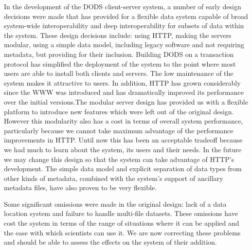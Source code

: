 \documentclass[12pt]{article}
\begin{document}
In the development of the \ac{DODS} client-server system, a number of early
design decisions were made that has provided for a flexible data system
capable of broad system-wide interoperability and deep interoperability for
subsets of data within the system. These design decisions include: using
\acs{HTTP}, making the servers modular, using a simple data model, including 
legacy software and not requiring metadata, but providing for their inclusion. 
Building \ac{DODS} on a transaction protocol has simplified the
deployment of the system to the point where most users are able to install
both clients and servers. The low maintenance of the system makes it
attractive to users. In addition, \acs{HTTP} has grown considerably since the
\ac{WWW} was introduced and has dramatically improved its performance over
the initial versions.The modular server design has provided us with a
flexible platform to introduce new features which were left out of the
original design. However this modularity also has a cost in terms of overall
system performance, particularly because we cannot take maximum advantage of
the performance improvements in \acs{HTTP}.  Until now this has been an
acceptable tradeoff because we had much to learn about the system, its users
and their needs. In the future we may change this design so that the system
can take advantage of \acs{HTTP}'s development. The simple data model and
explicit separation of data types from other kinds of metadata, combined with
the system's support of ancillary metadata files, have also proven to be very
flexible.

Some significant omissions were made in the original design: lack of a data
location system and failure to handle multi-file datasets. These omissions have
cost the system in terms of the range of situations where it can be applied
and the ease with which scientists can use it. We are now correcting these
problems and should be able to assess the effects on the system of their
addition.
\end{document}
